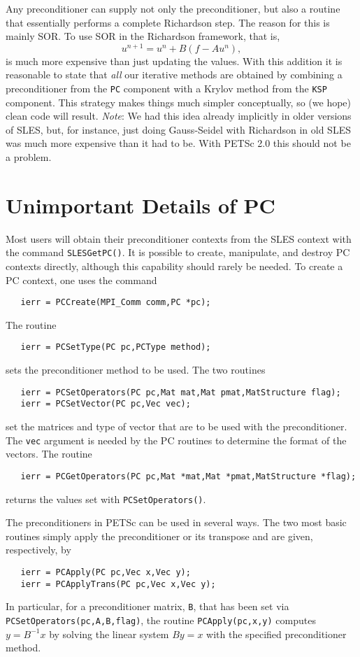 Any preconditioner can supply not 
only the preconditioner, but also a routine that essentially performs a
complete Richardson step. The reason for this is mainly SOR. To 
use SOR in the Richardson framework, that is,
\[
  u^{n+1} = u^{n} + B(f - A u^{n}), 
\]
is much more expensive than just updating the values.
With this addition it is reasonable to state that {\em all} our
iterative methods are obtained by combining a preconditioner from 
the {\tt PC} component with a Krylov method from the {\tt KSP}
component. This strategy makes things much simpler conceptually, so 
(we hope)
clean code will result. {\em Note}: We had this idea already implicitly in 
older versions of SLES, but, for instance, just doing Gauss-Seidel
with Richardson in old SLES was much more expensive than it had to be. 
With PETSc 2.0 this should not be a problem. 

\section{Unimportant Details of PC}

Most users will obtain their preconditioner contexts from the SLES
context with the command {\tt SLESGetPC()}. It is possible to create,
manipulate, and destroy PC contexts directly, although this capability
should rarely be needed. To create a PC context, one uses the command
\begin{verbatim}
   ierr = PCCreate(MPI_Comm comm,PC *pc);
\end{verbatim}
The routine 
\begin{verbatim}
   ierr = PCSetType(PC pc,PCType method);
\end{verbatim}
sets the preconditioner method to be used. 
The two routines  
\begin{verbatim}
   ierr = PCSetOperators(PC pc,Mat mat,Mat pmat,MatStructure flag);
   ierr = PCSetVector(PC pc,Vec vec);
\end{verbatim}
set the matrices and type of vector that are to be used with 
the preconditioner.  The {\tt vec} argument is needed by the PC routines 
to determine the format of the vectors. 
The routine 
\begin{verbatim}
   ierr = PCGetOperators(PC pc,Mat *mat,Mat *pmat,MatStructure *flag);
\end{verbatim}
returns the values set with {\tt PCSetOperators()}.

  
The preconditioners in PETSc can be used in several ways.  The two
most basic routines simply apply the preconditioner or its transpose
and are given, respectively, by
\begin{verbatim}
   ierr = PCApply(PC pc,Vec x,Vec y);
   ierr = PCApplyTrans(PC pc,Vec x,Vec y);
\end{verbatim}
In particular, for a preconditioner matrix, {\tt B}, that has
been set via {\tt PCSetOperators(pc,A,B,flag)},
the routine {\tt PCApply(pc,x,y)} computes $y = B^{-1} x$
by solving the linear system $By = x$ with the specified preconditioner
method.

